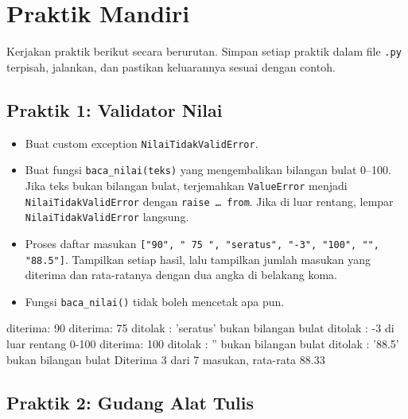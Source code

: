 \section{Praktik Mandiri}

Kerjakan praktik berikut secara berurutan. Simpan setiap praktik dalam file \texttt{.py} terpisah, jalankan, dan pastikan keluarannya sesuai dengan contoh.

\subsection{Praktik 1: Validator Nilai}

\begin{itemize}
  \item Buat custom exception \texttt{NilaiTidakValidError}.
  \item Buat fungsi \texttt{baca\_nilai(teks)} yang mengembalikan bilangan bulat 0--100. Jika teks bukan bilangan bulat, terjemahkan \texttt{ValueError} menjadi \texttt{NilaiTidakValidError} dengan \texttt{raise \ldots\ from}. Jika di luar rentang, lempar \texttt{NilaiTidakValidError} langsung.
  \item Proses daftar masukan \texttt{["90", " 75 ", "seratus", "-3", "100", "", "88.5"]}. Tampilkan setiap hasil, lalu tampilkan jumlah masukan yang diterima dan rata-ratanya dengan dua angka di belakang koma.
  \item Fungsi \texttt{baca\_nilai()} tidak boleh mencetak apa pun.
\end{itemize}

\begin{keluaran}
diterima: 90
diterima: 75
ditolak : 'seratus' bukan bilangan bulat
ditolak : -3 di luar rentang 0-100
diterima: 100
ditolak : '' bukan bilangan bulat
ditolak : '88.5' bukan bilangan bulat
Diterima 3 dari 7 masukan, rata-rata 88.33
\end{keluaran}

\subsection{Praktik 2: Gudang Alat Tulis}

